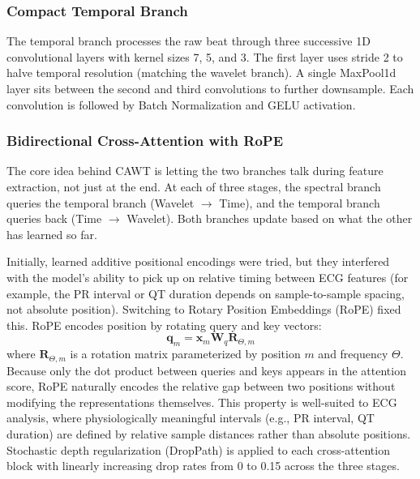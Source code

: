 \documentclass[conference]{IEEEtran}
\begin{document}
\subsubsection{Compact Temporal Branch}
The temporal branch processes the raw beat through three successive 1D convolutional layers with kernel sizes 7, 5, and 3. The first layer uses stride 2 to halve temporal resolution (matching the wavelet branch). A single MaxPool1d layer sits between the second and third convolutions to further downsample. Each convolution is followed by Batch Normalization and GELU activation.
 
\subsubsection{Bidirectional Cross-Attention with RoPE}
The core idea behind CAWT is letting the two branches talk during feature extraction, not just at the end. At each of three stages, the spectral branch queries the temporal branch (Wavelet $\to$ Time), and the temporal branch queries back (Time $\to$ Wavelet). Both branches update based on what the other has learned so far.
 
Initially, learned additive positional encodings were tried, but they interfered with the model's ability to pick up on relative timing between ECG features (for example, the PR interval or QT duration depends on sample-to-sample spacing, not absolute position). Switching to Rotary Position Embeddings (RoPE) fixed this. RoPE encodes position by rotating query and key vectors:
\begin{equation}
    \mathbf{q}_m = \mathbf{x}_m \mathbf{W}_q \mathbf{R}_{\Theta, m}
\end{equation}
where $\mathbf{R}_{\Theta,m}$ is a rotation matrix parameterized by position $m$ and frequency $\Theta$. Because only the dot product between queries and keys appears in the attention score, RoPE naturally encodes the relative gap between two positions without modifying the representations themselves. This property is well-suited to ECG analysis, where physiologically meaningful intervals (e.g., PR interval, QT duration) are defined by relative sample distances rather than absolute positions. Stochastic depth regularization (DropPath) is applied to each cross-attention block with linearly increasing drop rates from 0 to 0.15 across the three stages.
 
\end{document}
